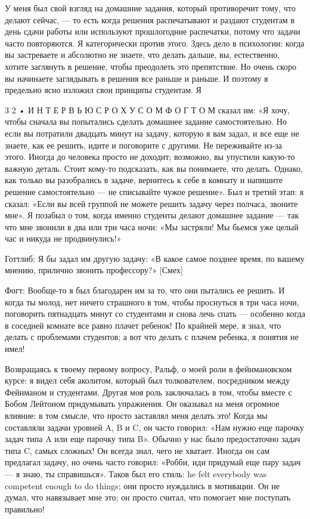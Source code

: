 \documentclass[10pt,oneside]{article}
\begin{document}
У меня был свой взгляд на домашние задания, который противоречит тому, что делают сейчас, --- то есть когда решения распечатывают и раздают студентам в день сдачи работы или используют прошлогодние распечатки, потому что задачи часто повторяются. Я категорически против этого. Здесь дело в психологии: когда вы застреваете и абсолютно не знаете, что делать дальше, вы, естественно, хотите заглянуть в решение, чтобы преодолеть это препятствие. Но очень скоро вы начинаете заглядывать в решения все раньше и раньше. И поэтому я предельно ясно изложил свои принципы студентам. Я\par

3 2 • И Н Т Е Р В Ь Ю  С  Р О Х У С О М  Ф О Г Т О М сказал им: «Я хочу, чтобы сначала вы попытались сделать домашнее задание самостоятельно. Но если вы потратили двадцать минут на задачу, которую я вам задал, и все еще не знаете, как ее решить, идите и поговорите с другими. Не переживайте из-за этого. Иногда до человека просто не доходит; возможно, вы упустили какую-то важную деталь. Стоит кому-то подсказать, как вы понимаете, что делать. Однако, как только вы разобрались в задаче, вернитесь к себе в комнату и напишите решение самостоятельно --- не списывайте чужое решение». Был и третий этап: я сказал: «Если вы всей группой не можете решить задачу через полчаса, звоните мне». Я позабыл о том, когда именно студенты делают домашнее задание --- так что мне звонили в два или три часа ночи: «Мы застряли! Мы бьемся уже целый час и никуда не продвинулись!»\par

Готтлиб: Я бы задал им другую задачу: «В какое самое позднее время, по вашему мнению, прилично звонить профессору?» [Смех]\par

Фогт: Вообще-то я был благодарен им за то, что они пытались ее решить. И когда ты молод, нет ничего страшного в том, чтобы проснуться в три часа ночи, поговорить пятнадцать минут со студентами и снова лечь спать --- особенно когда в соседней комнате все равно плачет ребенок! По крайней мере, я знал, что делать с проблемами студентов; а вот что делать с плачем ребенка, я понятия не имел!\par

Возвращаясь к твоему первому вопросу, Ральф, о моей роли в фейнмановском курсе: я видел себя аколитом, который был толкователем, посредником между Фейнманом и студентами. Другая моя роль заключалась в том, чтобы вместе с Бобом Лейтоном придумывать упражнения. Он оказывал на меня огромное влияние: в том смысле, что просто заставлял меня делать это! Когда мы составляли задачи уровней A, B и C, он часто говорил: «Нам нужно еще парочку задач типа A или еще парочку типа B». Обычно у нас было предостаточно задач типа C, самых сложных! Он всегда знал, чего не хватает. Иногда он сам предлагал задачу, но очень часто говорил: «Робби, иди придумай еще пару задач --- я знаю, ты справишься». Таков был его стиль: he felt everybody was competent enough to do things; они просто нуждались в мотивации. Он не думал, что навязывает мне это; он просто считал, что помогает мне поступать правильно!\par
\end{document}
